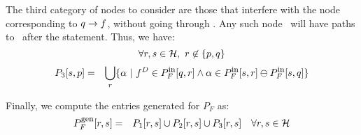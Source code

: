 The  third  category of  nodes  to  consider  are those  that
interfere with  the node corresponding  to $q\rightarrow f$,
without going through \q.  Any such node \s\ will have paths to
\p\ after the statement. Thus, we have:
\[ \forall r,s \in \mathcal{H},\ r \not\in \{p,q\} \]
\begin{eqnarray*}
  P_3[s, p] &=& \bigcup_{r}\{ \alpha \ \vert 
  \ f^{D}  \in P_F^{\mbox{\footnotesize in}}[q, r] 
  \wedge \alpha \in  P_F^{\mbox{\footnotesize in}}[s, r] \ominus P_F^{\mbox{\footnotesize in}}[s, q] \}
\end{eqnarray*}

Finally, we compute the entries generated for $P_F$ as:
\begin{eqnarray*}
P_F^{\mbox{\footnotesize gen}}[r, s] &= & P_1[r, s] \cup P_2[r, s]
\cup P_3[r, s] \quad \forall r, s \in \mathcal{H}  \\ 
\end{eqnarray*}
